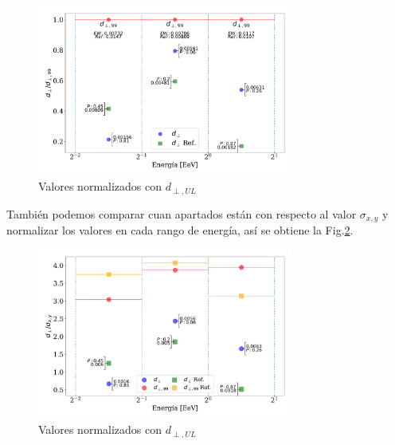     \begin{figure}[H]
        \begin{small}
            \begin{center}
                \includegraphics[width=0.75\textwidth]{d_perp_normalizado.pdf}
            \end{center}
            \caption{Valores normalizados con $d_{\perp,UL}$}
            \label{fig:normalizado}
        \end{small}
    \end{figure}

    También podemos comparar cuan apartados están con respecto al valor $\sigma_{x,y}$ y normalizar los valores en cada rango de energía, así se obtiene la Fig.\ref{fig:normalizado_sigma}.

    \begin{figure}[H]
        \begin{small}
            \begin{center}
                \includegraphics[width=0.75\textwidth]{d_perp_normalizado_sigmas_v4.pdf}
            \end{center}
            \caption{Valores normalizados con $d_{\perp,UL}$}
            \label{fig:normalizado_sigma}
        \end{small}
    \end{figure}

